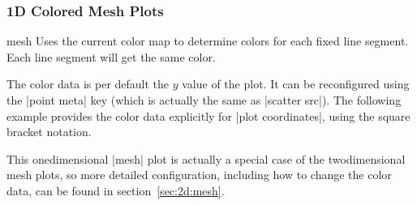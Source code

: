 \subsubsection{1D Colored Mesh Plots}
\begin{plottype}{mesh}
	Uses the current color map to determine colors for each fixed line segment. Each line segment will get the same color.
\begin{codeexample}[]
\end{codeexample}
	The color data is per default the $y$ value of the plot. It can be reconfigured using the |point meta| key (which is actually the same as |scatter src|). The following example provides the color data explicitly for |plot coordinates|, using the square bracket notation.
\begin{codeexample}[]
\end{codeexample}
	This onedimensional |mesh| plot is actually a special case of the twodimensional mesh plots, so more detailed configuration, including how to change the color data, can be found in section~\ref{sec:2d:mesh}.

\end{plottype}


